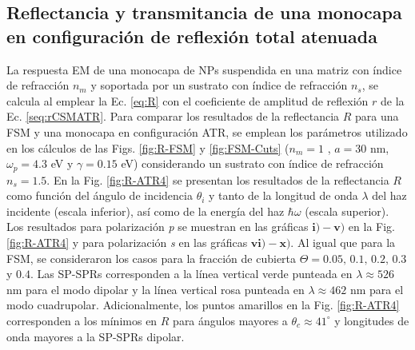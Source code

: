 	\subsection{Reflectancia y transmitancia de una monocapa en configuración de reflexión total atenuada}
	\label{ssection:DrudeATR}

La respuesta EM de una monocapa de NPs suspendida en una matriz con índice de refracción $n_m$ y soportada por un sustrato con índice de refracción $n_s$, se calcula al emplear la Ec.  \eqref{eq:R} con el coeficiente de amplitud de reflexión $r$ de la Ec.  \eqref{seq:rCSMATR}. Para comparar los resultados de la reflectancia $R$ para una FSM y una monocapa en configuración ATR, se emplean los parámetros utilizado en los cálculos de las Figs. \ref{fig:R-FSM} y \ref{fig:FSM-Cuts} ($n_m=1$ , $a=30$ nm, $\omega_p=4.3$ eV y  $\gamma = 0.15$ eV) considerando un sustrato con índice de refracción $n_s=1.5$. En la Fig.  \ref{fig:R-ATR4} se presentan los resultados de la reflectancia $R$ como función del ángulo de incidencia $\theta_i$ y tanto de la longitud de onda $\lambda$ del haz incidente (escala inferior), así como de la energía del haz $\hbar\omega$ (escala superior). Los resultados para polarización \emph{p} se muestran en las gráficas $\mathbf{i)-v)}$ en la Fig.  \ref{fig:R-ATR4} y para polarización \emph{s} en las gráficas $\mathbf{vi)-x)}$. Al igual que para la FSM, se consideraron los casos para la fracción de cubierta $\Theta = 0.05,\,0.1,\,0.2,\,0.3$ y $0.4$. Las SP-SPRs corresponden a la línea vertical verde punteada en $\lambda \approx 526$ nm para el modo dipolar y la línea vertical rosa punteada en  $\lambda \approx 462$ nm para el modo cuadrupolar. Adicionalmente, los puntos amarillos en la Fig. \ref{fig:R-ATR4} corresponden a los mínimos en $R$ para ángulos mayores a $\theta_c\approx 41^\circ$ y longitudes de onda mayores a la SP-SPRs dipolar.

